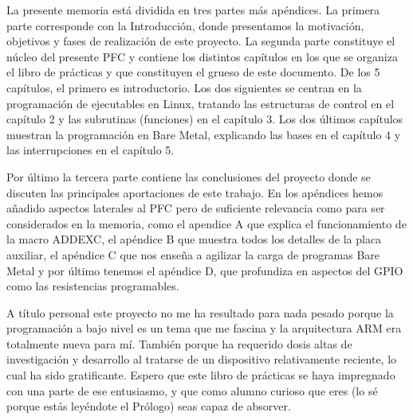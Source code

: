 
La presente memoria está dividida en tres partes más apéndices. La primera
parte corresponde con la Introducción, donde presentamos la motivación, objetivos
y fases de realización de este proyecto. La segunda parte constituye el núcleo
del presente PFC y contiene los distintos capítulos en los que se organiza el
libro de prácticas y que constituyen el grueso de este documento. De los 5
capítulos, el primero es introductorio. Los dos siguientes se centran en la
programación de ejecutables en Linux, tratando las estructuras de control en el
capítulo 2 y las subrutinas (funciones) en el capítulo 3. Los dos últimos
capítulos muestran la programación en Bare Metal, explicando las bases en
el capítulo 4 y las interrupciones en el capítulo 5.

Por último la tercera parte contiene las conclusiones del proyecto donde se
discuten las principales aportaciones de este trabajo. En los apéndices hemos
añadido aspectos laterales al PFC pero de suficiente relevancia como para ser
considerados en la memoria, como el apendice A que explica el funcionamiento
de la macro ADDEXC, el apéndice B que muestra todos los detalles de la placa
auxiliar, el apéndice C que nos enseña a agilizar la carga de programas Bare Metal
y por último tenemos el apéndice D, que profundiza en aspectos del GPIO como
las resistencias programables.

A título personal este proyecto no me ha resultado para nada pesado porque
la programación a bajo nivel es un tema que me fascina y la arquitectura ARM
era totalmente nueva para mí. También porque ha requerido dosis altas de
investigación y desarrollo al tratarse de un dispositivo relativamente
reciente, lo cual ha sido gratificante. Espero que este libro de prácticas se
haya impregnado con una parte de ese entusiasmo, y que como alumno curioso
que eres (lo sé porque estás leyéndote el Prólogo) seas capaz de absorver.

\chapterend
